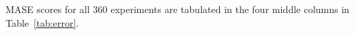 \documentclass[%
pre,
reprint,
superscriptaddress,
showpacs,
nofootinbib,
nobibnotes,
 amsmath,amssymb,
 aps,
]{revtex4-1}
\newcommand{\gcc}{{\tt 403.gcc}\xspace}
\newcommand{\svdone}{{\tt dgesdd}$_1$\xspace}
\newcommand{\svdtwo}{{\tt dgesdd$_2$}\xspace}
\newcommand{\svdthree}{{\tt dgesdd$_3$}\xspace}
\newcommand{\svdfour}{{\tt dgesdd$_4$}\xspace}
\newcommand{\svdfive}{{\tt dgesdd$_5$}\xspace}
\newcommand{\svdsix}{{\tt dgesdd$_6$}\xspace}
\newcommand{\arima}{{\tt auto.arima}\xspace}
\newcommand{\col}{{\tt col\_major}\xspace}
\newcommand{\alert}[1]{{\color{red}#1}}
\begin{document}
MASE scores for all 360 experiments are tabulated in the four middle
columns in Table~\ref{tab:error}.
%
%
%
%
%
%
%
%
%
%  
\end{document}
